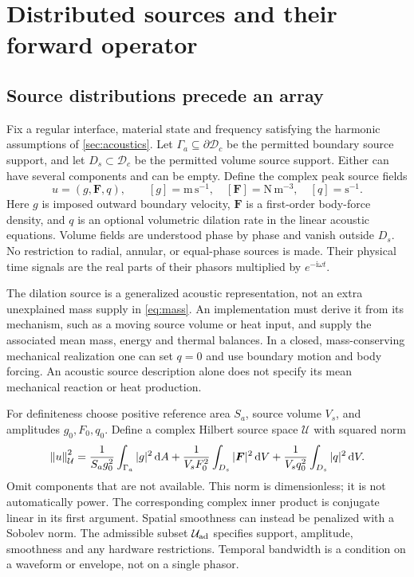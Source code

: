 \section{Distributed sources and their forward operator}\label{sec:sources}

\subsection{Source distributions precede an array}
Fix a regular interface, material state and frequency satisfying the harmonic
assumptions of \cref{sec:acoustics}. Let $\Gamma_a\subseteq\partial\mathcal D_c$
be the permitted boundary source support, and let $D_s\subset\mathcal D_c$ be
the permitted volume source support. Either can have several components and
can be empty. Define the complex peak source fields
\begin{equation}
 u=(g,\bm F,q),\qquad
 [g]=\mathrm{m\,s^{-1}},\quad [\bm F]=\mathrm{N\,m^{-3}},
 \quad [q]=\mathrm{s^{-1}}.
 \label{eq:distributed-control}
\end{equation}
Here $g$ is imposed outward boundary velocity, $\bm F$ is a first-order
body-force density, and $q$ is an optional volumetric dilation rate in the
linear acoustic equations. Volume fields are understood phase by phase and
vanish outside $D_s$. No restriction to radial, annular, or equal-phase
sources is made. Their physical time signals are the real parts of their
phasors multiplied by $e^{-\mathrm i\omega t}$.

The dilation source is a generalized acoustic representation, not an extra
unexplained mass supply in \cref{eq:mass}. An implementation must derive it
from its mechanism, such as a moving source volume or heat input, and supply
the associated mean mass, energy and thermal balances. In a closed,
mass-conserving mechanical realization one can set $q=0$ and use boundary
motion and body forcing. An acoustic source description alone does not specify
its mean mechanical reaction or heat production.

For definiteness choose positive reference area $S_a$, source volume $V_s$,
and amplitudes $g_0,F_0,q_0$. Define a complex Hilbert source space
$\mathcal U$ with squared norm
\begin{equation}
 \left\lVert u\right\rVert_{\mathcal U}^2=
 \frac{1}{S_ag_0^2}\int_{\Gamma_a}|g|^2\,\mathrm d A+
 \frac{1}{V_sF_0^2}\int_{D_s}|\bm F|^2\,\mathrm d V+
 \frac{1}{V_sq_0^2}\int_{D_s}|q|^2\,\mathrm d V.
 \label{eq:source-norm}
\end{equation}
Omit components that are not available. This norm is dimensionless; it is not
automatically power. The corresponding complex inner product is conjugate
linear in its first argument. Spatial smoothness can instead be penalized
with a Sobolev norm. The admissible subset $\mathcal U_{\rm ad}$ specifies
support, amplitude, smoothness and any hardware restrictions. Temporal
bandwidth is a condition on a waveform or envelope, not on a single phasor.

